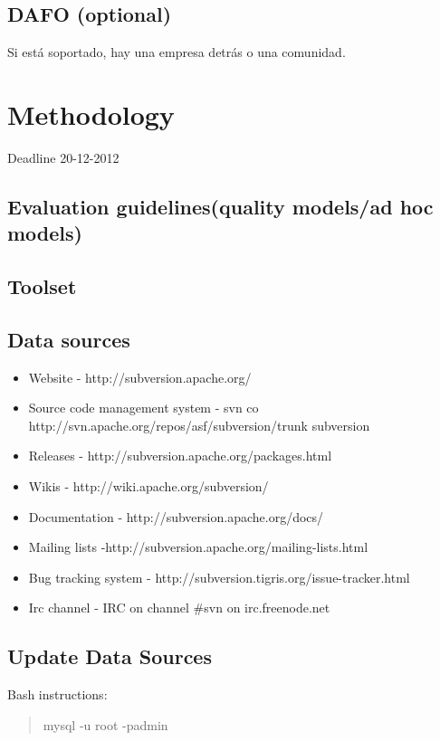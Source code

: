 \documentclass[11pt]{scrartcl}
\begin{document}
\subsection{DAFO (optional)}

Si está soportado, hay una empresa detrás o una comunidad.

\section{Methodology}

Deadline 20-12-2012

\subsection{Evaluation guidelines(quality models/ad hoc models)}
\subsection{Toolset}
\subsection{Data sources}

\begin{itemize}
    \item Website - http://subversion.apache.org/
    \item Source code management system - svn co http://svn.apache.org/repos/asf/subversion/trunk subversion
    \item Releases - http://subversion.apache.org/packages.html
    \item Wikis - http://wiki.apache.org/subversion/
    \item Documentation - http://subversion.apache.org/docs/
    \item Mailing lists -http://subversion.apache.org/mailing-lists.html
    \item Bug tracking system - http://subversion.tigris.org/issue-tracker.html
    \item Irc channel - IRC on channel \#svn on irc.freenode.net
\end{itemize}

\subsection{Update Data Sources}

Bash instructions:

\begin{quote}
    mysql -u root -padmin
\end{quote}
\end{document}
